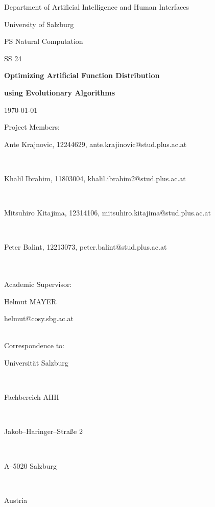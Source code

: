 \documentclass[12pt,fleqn,a4paper]{article}
\begin{document}

\begin{titlepage}%
\vspace{2cm}
\centerline{
\large{Department of Artificial Intelligence and Human Interfaces}}
\vspace{0.2cm}
\centerline{\large{University of Salzburg}}
\vspace{2cm}

\centerline{\large{PS Natural Computation}}
\centerline{SS 24}
\vspace{1cm}

\centerline{\Large{\bf{Optimizing Artificial Function Distribution}} }%
\vspace{0.2cm}
\centerline{\Large{\bf{using Evolutionary Algorithms}} }%
\vspace{1cm}

\vspace{0.4cm}%
\centerline{\today}
\vspace{4cm}%

Project Members:\\
\centerline{Ante Krajnovic, 12244629, ante.krajinovic@stud.plus.ac.at}\\
\centerline{Khalil Ibrahim, 11803004, khalil.ibrahim2@stud.plus.ac.at}\\
\centerline{Mitsuhiro Kitajima, 12314106, mitsuhiro.kitajima@stud.plus.ac.at}\\
\centerline{Peter Balint, 12213073, peter.balint@stud.plus.ac.at}\\
\vspace {1cm}\\

Academic Supervisor: \\
\centerline{Helmut MAYER}
\centerline{helmut@cosy.sbg.ac.at}
\vspace{1.5cm}\\
Correspondence to: \\
\centerline{Universit\"{a}t Salzburg} \\
\centerline{Fachbereich AIHI} \\
\centerline{Jakob--Haringer--Stra\ss e 2} \\
\centerline{A--5020 Salzburg} \\
\centerline{Austria}
\clearpage
\end{titlepage}

\end{document}
